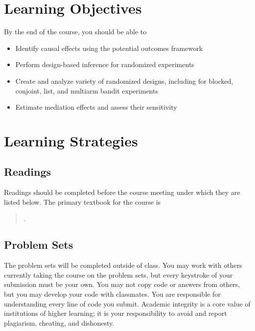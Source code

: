 \documentclass[11pt]{article}
\newcommand{\bibverse}[1]{\begin{verse} \bibentry{#1}. \end{verse}}
\begin{document}
\section*{Learning Objectives}

By the end of the course, you should be able to 

\begin{itemize}
\item Identify causal effects using the potential outcomes framework
\item Perform design-based inference for randomized experiments
\item Create and analyze variety of randomized designs, including for blocked, conjoint, list, and multiarm bandit experiments
\item Estimate mediation effects and assess their sensitivity
\end{itemize}

\section*{Learning Strategies}

\subsection*{Readings}

Readings should be completed before the course meeting under which they are listed below.  The primary textbook for the course is 

\nobibliography*

\bibverse{gergre12}


\subsection*{Problem Sets}
The problem sets will be completed outside of class.  You may work with others currently taking the course on the problem sets, but every keystroke of your submission must be your own.  You may not copy code or answers from others, but you may develop your code with classmates.  You are responsible for understanding every line of code you submit.  Academic integrity is a core value of institutions of higher learning; it is your responsibility to avoid and report plagiarism, cheating, and
dishonesty.  
\end{document}
